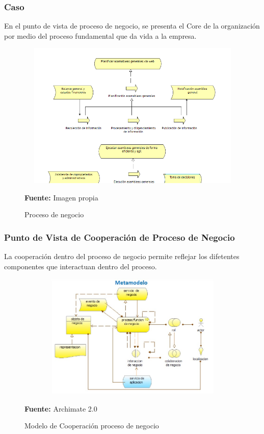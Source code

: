 \subsubsection{Caso}

En el punto de vista de proceso de negocio, se presenta el Core de la organización por medio del proceso fundamental que da vida a la empresa.

\begin{figure}[th!]
	\centering
	\includegraphics[width=15cm,height=7cm]{arquitectura/negocio/imgs/proceso}
	\caption{Proceso de negocio}{\scriptsize \textbf{Fuente:} Imagen propia}
\end{figure}
\newpage

\subsubsection{Punto de Vista de Cooperación de Proceso de Negocio}

La cooperación dentro del proceso de negocio permite reflejar los difetentes componentes que interactuan dentro del proceso.


\begin{figure}[th!]
	\centering
	\includegraphics[width=12cm,height=6cm]{arquitectura/negocio/imgs/Coop-proceso-negocio}
	\caption{Modelo de Cooperación proceso de negocio}{\scriptsize \textbf{Fuente:} Archimate 2.0 \cite{WEB7}}
\end{figure}

